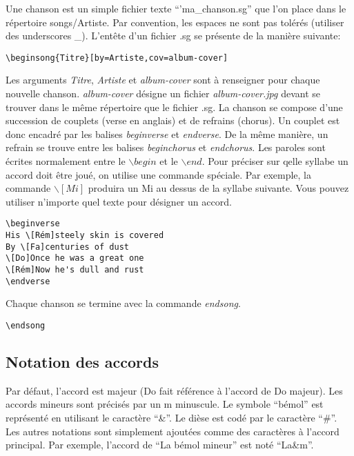 \documentclass[a4paper]{article}
\begin{document}
Une chanson est un simple fichier texte ``'ma\_chanson.sg'' que l'on
place dans le répertoire songs/Artiste. Par convention, les espaces ne
sont pas tolérés (utiliser des underscores \_). L'entête d'un fichier
.sg se présente de la manière suivante:

\begin{verbatim}
\beginsong{Titre}[by=Artiste,cov=album-cover]
\end{verbatim}

Les arguments \emph{Titre}, \emph{Artiste} et \emph{album-cover} sont
à renseigner pour chaque nouvelle chanson. \emph{album-cover} désigne
un fichier \emph{album-cover.jpg} devant se trouver dans le même
répertoire que le fichier .sg.  La chanson se compose d'une succession
de couplets (verse en anglais) et de refrains (chorus). Un couplet est
donc encadré par les balises \emph{beginverse} et \emph{endverse}. De
la même manière, un refrain se trouve entre les balises
\emph{beginchorus} et \emph{endchorus}.  Les paroles sont écrites
normalement entre le $\backslash begin$ et le $\backslash end$. Pour
préciser sur qelle syllabe un accord doit être joué, on utilise une
commande spéciale. Par exemple, la commande $\backslash [Mi]$ produira
un Mi au dessus de la syllabe suivante. Vous pouvez utiliser n'importe
quel texte pour désigner un accord.

\begin{verbatim}
\beginverse
His \[Rém]steely skin is covered
By \[Fa]centuries of dust
\[Do]Once he was a great one
\[Rém]Now he's dull and rust
\endverse
\end{verbatim}

Chaque chanson se termine avec la commande \emph{endsong}.

\begin{verbatim}
\endsong
\end{verbatim}

\subsection{Notation des accords}\label{sect:about}

Par défaut, l'accord est majeur (Do fait référence à l'accord de Do
majeur). Les accords mineurs sont précisés par un m minuscule.  Le
symbole ``bémol'' est représenté en utilisant le caractère ``\&''.  Le
dièse est codé par le caractère ``\#''. Les autres notations sont
simplement ajoutées comme des caractères à l'accord principal. Par
exemple, l'accord de ``La bémol mineur'' est noté ``La\&m''.
\end{document}
